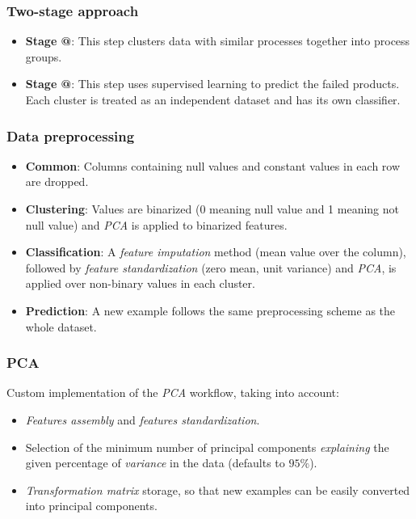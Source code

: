 \documentclass{beamer}
\makeatletter
\newcommand*{\rom}[1]{\expandafter\@slowromancap\romannumeral #1@}
\makeatother
\begin{document}
\begin{frame}
  \frametitle{Two-stage approach}
  \begin{itemize}[<+->]
    \item \textbf{Stage \rom{1}}: This step clusters data with similar processes together into process groups.
    \item \textbf{Stage \rom{2}}: This step uses supervised learning to predict the failed products. Each cluster is treated as an independent dataset and has its own classifier.
  \end{itemize}
\end{frame}

\begin{frame}
  \frametitle{Data preprocessing}
  \begin{itemize}[<+->]
    \item \textbf{Common}: Columns containing null values and constant values in each row are dropped.
    \item \textbf{Clustering}: Values are binarized (0 meaning null value and 1 meaning not null value) and \textit{PCA} is applied to binarized features.
    \item \textbf{Classification}: A \textit{feature imputation} method (mean value over the column), followed by \textit{feature standardization} (zero mean, unit variance) and \textit{PCA}, is applied over non-binary values in each cluster.
    \item \textbf{Prediction}: A new example follows the same preprocessing scheme as the whole dataset.
  \end{itemize}
\end{frame}

\begin{frame}
  \frametitle{PCA}
  Custom implementation of the \textit{PCA} workflow, taking into account:
  \begin{itemize}[<+->]
    \item \textit{Features assembly} and \textit{features standardization}.
    \item Selection of the minimum number of principal components \textit{explaining} the given percentage of \textit{variance} in the data (defaults to $95\%$).
    \item \textit{Transformation matrix} storage, so that new examples can be easily converted into principal components.
  \end{itemize}
\end{frame}

\end{document}
